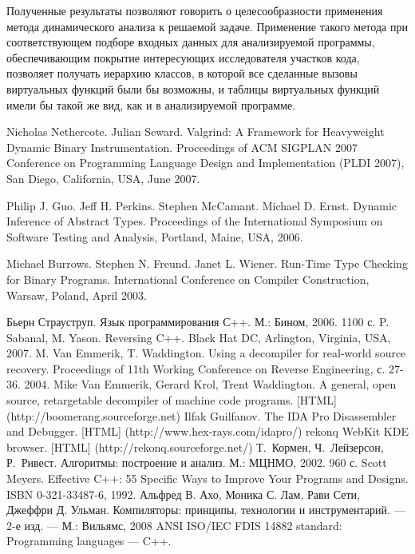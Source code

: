 \documentclass[a4paper,12pt,russian]{article}
\newcommand{\code}[1]{\textsf{#1}}
\begin{document}
Полученные результаты позволяют говорить о целесообразности применения метода динамического анализа к решаемой задаче.
Применение такого метода при соответствующем подборе входных данных для анализируемой программы, обеспечивающим покрытие интересующих исследователя участков кода, позволяет получать иерархию классов, в которой все сделанные вызовы виртуальных функций были бы возможны, и таблицы виртуальных функций имели бы такой же вид, как и в анализируемой программе.

\clearpage

\newpage
{}
\begin{thebibliography}{9}

     Nicholas Nethercote. Julian Seward. Valgrind: A Framework for Heavyweight Dynamic Binary Instrumentation. Proceedings of ACM SIGPLAN 2007 Conference on Programming Language Design and Implementation (PLDI 2007), San Diego, California, USA, June 2007.

     Philip J. Guo. Jeff H. Perkins. Stephen McCamant. Michael D. Ernst. Dynamic Inference of Abstract Types. Proceedings of the International Symposium on Software Testing and Analysis, Portland, Maine, USA, 2006.

     Michael Burrows. Stephen N. Freund. Janet L. Wiener. Run-Time Type Checking for Binary Programs. International Conference on Compiler Construction, Warsaw, Poland, April 2003.

     Бьерн Страуструп. Язык программирования С++. М.: Бином, 2006. 1100 с.
    P. Sabanal, M. Yason. Reversing C++. Black Hat DC, Arlington, Virginia, USA, 2007.
     M. Van Emmerik, T. Waddington. Using a decompiler for real-world source recovery. Proceedings of 11th Working Conference on Reverse Engineering, с. 27-36. 2004.
     Mike Van Emmerik, Gerard Krol, Trent Waddington. A general, open source, retargetable decompiler of machine code programs. [HTML] (\code{http://boomerang.sourceforge.net})
     Ilfak Guilfanov. The IDA Pro Disassembler and Debugger. [HTML] (\code{http://www.hex-rays.com/idapro/})
     rekonq WebKit KDE browser. [HTML] (\code{http://rekonq.sourceforge.net/})
     Т.~Кормен, Ч.~Лейзерсон, Р.~Ривест. Алгоритмы: построение и анализ. М.: МЦНМО, 2002. 960 с.
     Scott Meyers. Effective C++: 55 Specific Ways to Improve Your Programs and Designs. ISBN 0-321-33487-6, 1992.
     Альфред В. Ахо, Моника С. Лам, Рави Сети, Джеффри Д. Ульман. Компиляторы: принципы, технологии и инструментарий. — 2-е изд. — М.: Вильямс, 2008
     ANSI ISO/IEC FDIS 14882 standard: Programming languages --- C++.
\end{thebibliography}
\end{document}
